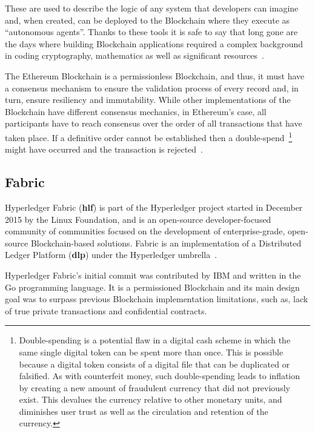   These are used to describe the logic of any system that developers can
  imagine and, when created, can be deployed to the Blockchain where they
  execute as “autonomous agents”.  Thanks to these tools it is safe to say that
  long gone are the days where building Blockchain applications required a
  complex background in coding cryptography, mathematics as well as significant
  resources~\cite{Wood2017,BlockGeeks2017}.

  The Ethereum Blockchain is a permissionless Blockchain, and thus, it must
  have a consensus mechanism to ensure the validation process of every record
  and, in turn, ensure resiliency and immutability. While other implementations
  of the Blockchain have different consensus mechanics, in Ethereum’s case, all
  participants have to reach consensus over the order of all transactions that
  have taken place. If a definitive order cannot be established then a
  double-spend~\footnote{Double-spending is a potential flaw in a digital cash
  scheme in which the same single digital token can be spent more than once.
  This is possible because a digital token consists of a digital file that can
  be duplicated or falsified. As with counterfeit money, such double-spending
  leads to inflation by creating a new amount of fraudulent currency that did
  not previously exist. This devalues the currency relative to other monetary
  units, and diminishes user trust as well as the circulation and retention of
  the currency.} might have occurred and the transaction is
  rejected~\cite{Wood2017}.

  \subsection{Fabric}

  Hyperledger Fabric (\textbf{hlf}) is part of the Hyperledger project started
  in December 2015 by the Linux Foundation, and is an open-source
  developer-focused community of communities focused on the development of
  enterprise-grade, open-source Blockchain-based solutions.  Fabric is an
  implementation of a Distributed Ledger Platform (\textbf{dlp}) under the
  Hyperledger umbrella~\cite{Cachin2016}.

  Hyperledger Fabric’s initial commit was contributed by IBM and written in the
  Go programming language.  It is a permissioned Blockchain and its main design
  goal was to surpass previous Blockchain implementation limitations, such as,
  lack of true private transactions and confidential contracts.


